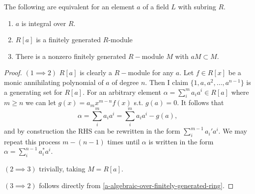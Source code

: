 \begin{proposition}\label{algebraic-int-iff-finitely-generated}
The following are equivalent for an element $a$ of a field $L$ with subring $R.$
\begin{enumerate}[(1)]
    \item $a$ is integral over $R$.
    \item $R[a]$ is a finitely generated $R$-module
    \item There is a nonzero finitely generated $R-$module $M$ with $aM\subset M.$
\end{enumerate}
\end{proposition}
\begin{proof}
$(1 \implies 2)$ $R[a]$ is clearly a $R-$module for any $a$. Let $f\in R[x]$ be a monic annihilating polynomial of $a$ of degree $n$. Then I claim $\{1,a,a^2,\dots,a^{n-1}\}$ is a generating set for $R[a]$. For an arbitrary element $\alpha=\sum_i^m a_ia^i\in R[a]$ where $m\geq n$ we can let $g(x)=a_mx^{m-n}f(x)$ s.t. $g(a)=0$. It follows that $$\alpha=\sum_i^{m}a_ia^i=\sum_i^{m}a_ia^i-g(a),$$ and by construction the RHS can be rewritten in the form $\sum_i^{m-1}a_i'a^i$. We may repeat this process $m-(n-1)$ times until $\alpha$ is written in the form $\alpha=\sum_i^{n-1} a_i^*a^i$.

$(2\implies 3)$ trivially, taking $M=R[a]$.

$(3\implies 2)$ follows directly from \cref{a-algebraic-over-finitely-generated-ring}.
\end{proof}


